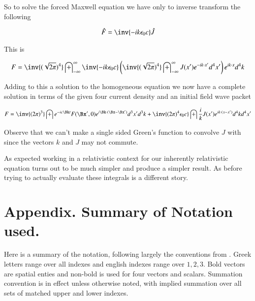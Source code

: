 \documentclass{article}
\newcommand{\IIinf}[0]{ \int_{-\infty}^\infty }
\begin{document}
So to solve the forced Maxwell equation we have only to inverse transform the following

\begin{align*}
\hat{F} = \inv{ -i k \epsilon_0 c} \hat{J}
\end{align*}

This is 

\begin{align*}
{F} 
&= \inv{(\sqrt{2\pi})^4} \IIinf \inv{ -i k \epsilon_0 c} \left( \inv{(\sqrt{2\pi})^4} \IIinf J(x') e^{ -i k \cdot x' } d^4 x' \right) e^{ i k \cdot x } d^4 k \\
\end{align*}

Adding to this a solution to the homogeneous equation we now have a complete solution in terms of the given four current density and an
initial field wave packet

\begin{align*}
{F} &= 
\inv{({2\pi})^3} \int e^{ -i c \Bk t } F(\Bx', 0) e^{ i \Bk \cdot (\Bx-\Bx') } d^3 x' d^3 k  
+
\inv{ ({2\pi})^4 \epsilon_0 c} \int \frac{i}{ k } J(x') e^{ i k \cdot (x - x') } d^4 k d^4 x' \\
\end{align*}

Observe that we can't make a single sided Green's function to convolve $J$ with since the vectors $k$ and $J$ may not commute.

As expected working in a relativistic context for our inherently relativistic equation turns out to be much simpler and produce a simpler result.  As before 
trying to actually evaluate these integrals is a different story.

\section{ Appendix.  Summary of Notation used. }

% 
%
Here is a summary of the notation, following largely the conventions from
\cite{doran2003gap}.
Greek letters range over all indexes and
english indexes range over $1,2,3$.  Bold vectors are spatial enties and non-bold is used for four vectors and scalars.
Summation convention is in effect unless otherwise noted, with implied summation over all sets of matched upper and lower indexes.
\end{document}

